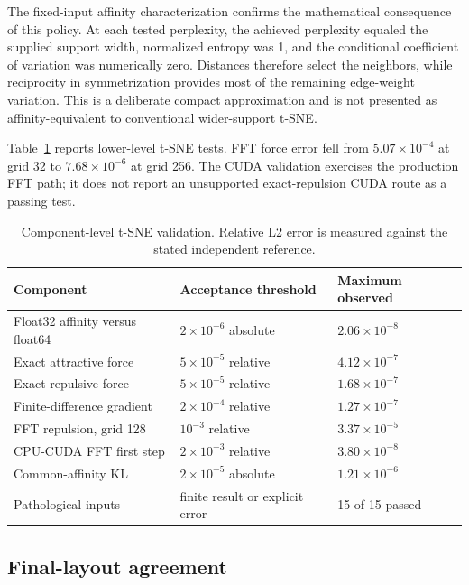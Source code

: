 \documentclass[article]{jss}
\begin{document}
The fixed-input affinity characterization confirms the mathematical
consequence of this policy. At each tested perplexity, the achieved
perplexity equaled the supplied support width, normalized entropy was 1, and
the conditional coefficient of variation was numerically zero. Distances
therefore select the neighbors, while reciprocity in symmetrization provides
most of the remaining edge-weight variation. This is a deliberate compact
approximation and is not presented as affinity-equivalent to conventional
wider-support t-SNE.

Table~\ref{tab:numerical} reports lower-level t-SNE tests. FFT force error fell
from $5.07\times10^{-4}$ at grid 32 to $7.68\times10^{-6}$ at grid 256.
The CUDA validation exercises the production FFT path; it does not report an
unsupported exact-repulsion CUDA route as a passing test.

\begin{table}[t]
\centering
\caption{Component-level t-SNE validation. Relative L2 error is measured
  against the stated independent reference.}
\label{tab:numerical}
\scriptsize
\begin{tabular}{p{}p{}p{}}
\toprule
Component & Acceptance threshold & Maximum observed \\
\midrule
Float32 affinity versus float64 & $2\times10^{-6}$ absolute &
  $2.06\times10^{-8}$ \\
Exact attractive force & $5\times10^{-5}$ relative &
  $4.12\times10^{-7}$ \\
Exact repulsive force & $5\times10^{-5}$ relative &
  $1.68\times10^{-7}$ \\
Finite-difference gradient & $2\times10^{-4}$ relative &
  $1.27\times10^{-7}$ \\
FFT repulsion, grid 128 & $10^{-3}$ relative & $3.37\times10^{-5}$ \\
CPU-CUDA FFT first step & $2\times10^{-3}$ relative &
  $3.80\times10^{-8}$ \\
Common-affinity KL & $2\times10^{-5}$ absolute &
  $1.21\times10^{-6}$ \\
Pathological inputs & finite result or explicit error & 15 of 15 passed \\
\bottomrule
\end{tabular}
\end{table}

\subsection{Final-layout agreement}
\end{document}
